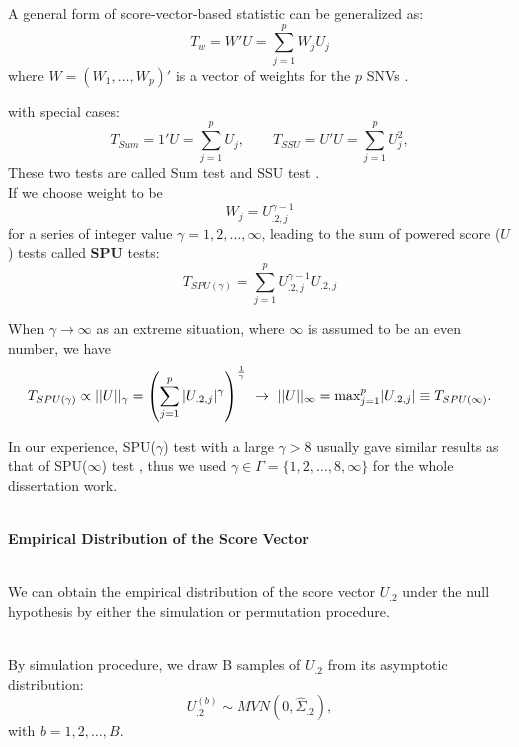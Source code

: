 \documentclass[compress]{beamer}
\begin{document}
{\framebreak
A general form of score-vector-based statistic can be generalized as:
$$
T_w = W' U = \sum_{j=1}^p W_j U_j
$$
where $W = (W_1, \ldots, W_p)'$ is a vector of weights for the $p$ SNVs \cite{Lin2011}. 

with special cases:
$$
T_{Sum} = 1' U = \sum_{j=1}^p U_j, \qquad T_{SSU} = U'U = \sum_{j=1}^p U_j^2,
$$
These two tests are called Sum test and SSU test \cite{Pan2009}. \\


\framebreak
If we choose weight to be
$$W_j = U_{.2, j} ^ { \gamma - 1} $$
for a series of integer value $\gamma = 1,2,\ldots,\infty$, leading to the sum of powered score ($U$) tests called \textbf{SPU} tests:
$$
T_{ SPU ( \gamma ) } = \sum_{j=1}^p U_{.2, j} ^ { \gamma - 1} U_{.2, j}
$$

When $\gamma \rightarrow \infty$ as an extreme situation, where $\infty$ is assumed to be an even number, we have
$$
T_{ SPU(\gamma) } \propto ||U||_{\gamma} = \left( \sum_{j=1}^p |U_{.2, j}| ^ { \gamma } \right) ^ { 1 \over \gamma } \ \rightarrow \ ||U||_{\infty} = \textrm{max}_{j=1} ^ p |U_{.2, j}| \equiv T_{ SPU(\infty) }.
$$ 

In our experience, SPU($\gamma$) test with a large $\gamma > 8$ usually gave similar results as that of SPU($\infty$) test \cite{pan2014powerful}, thus we used $\gamma \in \Gamma = \{1,2,\ldots,8,\infty \} $ for the whole dissertation work. \\\


\framebreak
\textbf{Empirical Distribution of the Score Vector}\\\


We can obtain the empirical distribution of the score vector $U_{.2}$ under the null hypothesis by either the simulation or permutation procedure.\\\

By simulation procedure, we draw B samples of $U_{.2}$ from its asymptotic distribution: 
$$U_{.2}^{ (b) } \sim MVN \left( 0, \hat{\Sigma}_{.2} \right),$$ 
with $b = 1,2,\ldots,B$.

}
\end{document}
